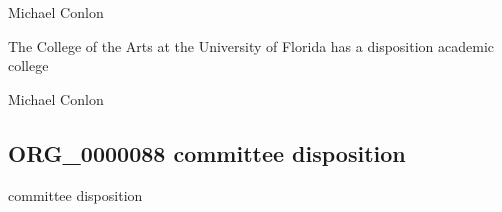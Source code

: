 \documentclass[letterpaper,10pt,english]{sphinxmanual}
\begin{document}
\begin{sphinxShadowBox}

\sphinxAtStartPar
Michael Conlon 
\end{sphinxShadowBox}

\begin{sphinxShadowBox}

\sphinxAtStartPar
The College of the Arts at the University of Florida has a disposition academic college
\end{sphinxShadowBox}

\begin{sphinxShadowBox}

\sphinxAtStartPar
{}
\end{sphinxShadowBox}

\begin{sphinxShadowBox}

\sphinxAtStartPar
Michael Conlon 
\end{sphinxShadowBox}
\begin{quote}

\ignorespaces \end{quote}


\subsection{ORG\_0000088 \sphinxhyphen{} committee disposition}
\label{\detokenize{doc-ORG_0000088:org-0000088-committee-disposition}}\label{\detokenize{doc-ORG_0000088:index-0}}\label{\detokenize{doc-ORG_0000088::doc}}
\begin{sphinxShadowBox}

\sphinxAtStartPar
committee disposition
\end{sphinxShadowBox}

\begin{sphinxShadowBox}

\sphinxAtStartPar
{\hyperref[\detokenize{doc-BFO_0000016::doc}]{}}
\end{sphinxShadowBox}
\end{document}
